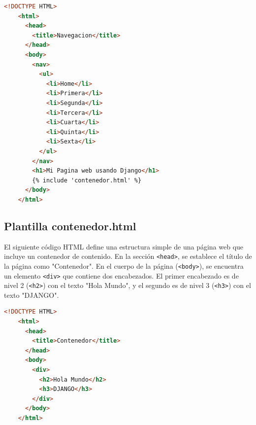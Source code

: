 \documentclass{article}
\begin{document}
  \begin{lstlisting}[language=html]
    <!DOCTYPE HTML>
    <html>
      <head>
        <title>Navegacion</title>
      </head>
      <body>
        <nav>
          <ul>
            <li>Home</li>
            <li>Primera</li>
            <li>Segunda</li>
            <li>Tercera</li>
            <li>Cuarta</li>
            <li>Quinta</li>
            <li>Sexta</li>
          </ul>
        </nav>
        <h1>Mi Pagina web usando Django</h1>
        {% include 'contenedor.html' %}
      </body>
    </html>
  \end{lstlisting}


  \subsection{Plantilla contenedor.html}
  El siguiente código HTML define una estructura simple de una página web que incluye un contenedor de contenido. 
  En la sección \texttt{<head>}, se establece el título de la página como "Contenedor". En el cuerpo de la página 
  (\texttt{<body>}), se encuentra un elemento \texttt{<div>} que contiene dos encabezados. El primer encabezado es de 
  nivel 2 (\texttt{<h2>}) con el texto "Hola Mundo", y el segundo es de nivel 3 (\texttt{<h3>}) con el texto "DJANGO".

  \begin{lstlisting}[language=html]
    <!DOCTYPE HTML>
    <html>
      <head>
        <title>Contenedor</title>
      </head>
      <body>
        <div>
          <h2>Hola Mundo</h2>
          <h3>DJANGO</h3>
        </div>
      </body>
    </html>
  \end{lstlisting}
  
  
\end{document}
